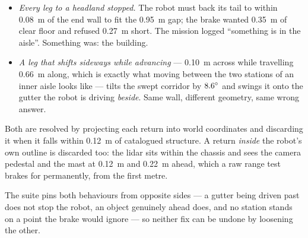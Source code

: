 \begin{itemize}[leftmargin=*,itemsep=1pt,topsep=2pt]
  \item \emph{Every leg to a headland stopped.} The robot must back its
        tail to within \SI{0.08}{m} of the end wall to fit the
        \SI{0.95}{m} gap; the brake wanted \SI{0.35}{m} of clear floor
        and refused \SI{0.27}{m} short. The mission logged ``something
        is in the aisle''. Something was: the building.
  \item \emph{A leg that shifts sideways while advancing} ---
        \SI{0.10}{m} across while travelling \SI{0.66}{m} along, which
        is exactly what moving between the two stations of an inner
        aisle looks like --- tilts the swept corridor by $8.6^\circ$
        and swings it onto the gutter the robot is driving \emph{beside}.
        Same wall, different geometry, same wrong answer.
\end{itemize}

Both are resolved by projecting each return into world coordinates and
discarding it when it falls within \SI{0.12}{m} of catalogued structure.
A return \emph{inside} the robot's own outline is discarded too: the
lidar sits within the chassis and sees the camera pedestal and the mast
at \SI{0.12}{m} and \SI{0.22}{m} ahead, which a raw range test brakes
for permanently, from the first metre.

The suite pins both behaviours from opposite sides --- a gutter being
driven past does not stop the robot, an object genuinely ahead does, and
no station stands on a point the brake would ignore --- so neither fix
can be undone by loosening the other.
